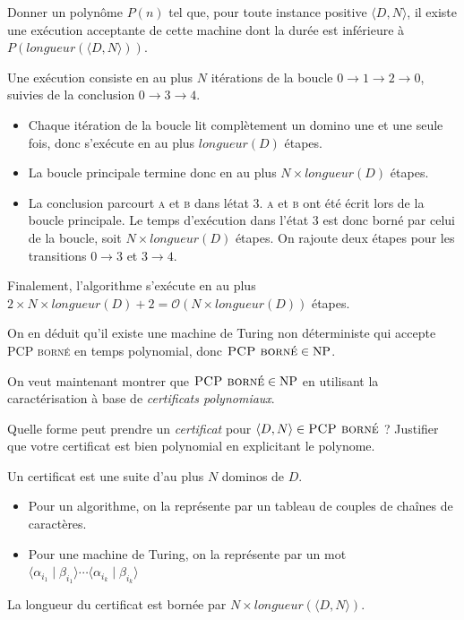 \begin{exercice}
  \begin{questions}
  \item Donner un polynôme $P(n)$ tel que, pour toute instance positive $\langle D, N \rangle$,
    il existe une exécution acceptante de cette machine dont la durée est inférieure à $P(\mathit{longueur}(\langle D, N \rangle))$.
  \end{questions}
  \begin{corrections}
    Une exécution consiste en au plus $N$ itérations de la boucle $0 \rightarrow 1 \rightarrow 2 \rightarrow 0$, suivies de la conclusion
    $0 \rightarrow 3 \rightarrow 4$.
    \begin{itemize}
    \item Chaque itération de la boucle lit complètement un domino une et une seule fois, donc s'exécute en au plus $\mathit{longueur}(D)$ étapes.
    \item La boucle principale termine donc en au plus $N \times \mathit{longueur}(D)$ étapes. 
    \item La conclusion parcourt \textsc{a} et \textsc{b} dans létat $3$.
      \textsc{a} et \textsc{b} ont été écrit lors de la boucle principale.
      Le temps d'exécution dans l'état $3$ est donc borné par celui de la boucle, soit $N \times \mathit{longueur}(D)$ étapes.
      On rajoute deux étapes pour les transitions $0 \rightarrow 3$ et $3 \rightarrow 4$.
    \end{itemize}
    Finalement, l'algorithme s'exécute en au plus $2 \times N \times \mathit{longueur}(D) + 2 = \mathcal{O}(N \times \mathit{longueur}(D))$ étapes. 
  \end{corrections}
  
  On en déduit qu'il existe une machine de Turing non déterministe qui accepte \textsc{PCP borné} en temps polynomial,
  donc $\textsc{PCP borné} \in \text{NP}$.

  On veut maintenant montrer que $\textsc{PCP borné} \in \text{NP}$ en utilisant la caractérisation à base de \emph{certificats polynomiaux}.
  
  \begin{questions}
  \item Quelle forme peut prendre un \emph{certificat} pour $\langle D, N \rangle \in \textsc{PCP borné}$ ?
    Justifier que votre certificat est bien polynomial en explicitant le polynome.
  \end{questions}
  \begin{corrections}
    Un certificat est une suite d'au plus $N$ dominos de $D$.
    \begin{itemize}
    \item Pour un algorithme, on la représente par un tableau de couples de chaînes de caractères.
    \item Pour une machine de Turing, on la représente par un mot
      $\langle \alpha_{i_1} \mid \beta_{i_1} \rangle \cdots \langle \alpha_{i_k} \mid \beta_{i_k} \rangle$
    \end{itemize}
    La longueur du certificat est bornée par $N \times \mathit{longueur}(\langle D, N \rangle)$.
  \end{corrections}


\end{exercice}
